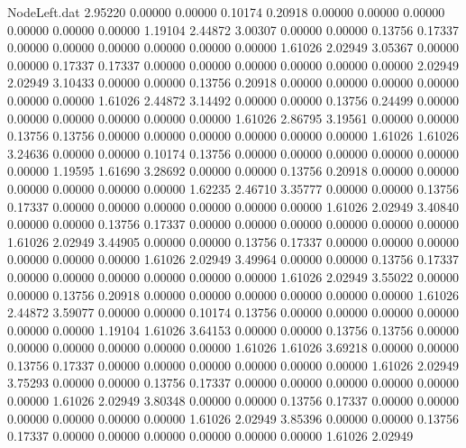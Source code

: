 \begin{filecontents}{NodeLeft.dat}
   2.95220    0.00000    0.00000     0.10174    0.20918    0.00000    0.00000    0.00000    0.00000    0.00000    0.00000    1.19104    2.44872
   3.00307    0.00000    0.00000     0.13756    0.17337    0.00000    0.00000    0.00000    0.00000    0.00000    0.00000    1.61026    2.02949
   3.05367    0.00000    0.00000     0.17337    0.17337    0.00000    0.00000    0.00000    0.00000    0.00000    0.00000    2.02949    2.02949
   3.10433    0.00000    0.00000     0.13756    0.20918    0.00000    0.00000    0.00000    0.00000    0.00000    0.00000    1.61026    2.44872
   3.14492    0.00000    0.00000     0.13756    0.24499    0.00000    0.00000    0.00000    0.00000    0.00000    0.00000    1.61026    2.86795
   3.19561    0.00000    0.00000     0.13756    0.13756    0.00000    0.00000    0.00000    0.00000    0.00000    0.00000    1.61026    1.61026
   3.24636    0.00000    0.00000     0.10174    0.13756    0.00000    0.00000    0.00000    0.00000    0.00000    0.00000    1.19595    1.61690
   3.28692    0.00000    0.00000     0.13756    0.20918    0.00000    0.00000    0.00000    0.00000    0.00000    0.00000    1.62235    2.46710
   3.35777    0.00000    0.00000     0.13756    0.17337    0.00000    0.00000    0.00000    0.00000    0.00000    0.00000    1.61026    2.02949
   3.40840    0.00000    0.00000     0.13756    0.17337    0.00000    0.00000    0.00000    0.00000    0.00000    0.00000    1.61026    2.02949
   3.44905    0.00000    0.00000     0.13756    0.17337    0.00000    0.00000    0.00000    0.00000    0.00000    0.00000    1.61026    2.02949
   3.49964    0.00000    0.00000     0.13756    0.17337    0.00000    0.00000    0.00000    0.00000    0.00000    0.00000    1.61026    2.02949
   3.55022    0.00000    0.00000     0.13756    0.20918    0.00000    0.00000    0.00000    0.00000    0.00000    0.00000    1.61026    2.44872
   3.59077    0.00000    0.00000     0.10174    0.13756    0.00000    0.00000    0.00000    0.00000    0.00000    0.00000    1.19104    1.61026
   3.64153    0.00000    0.00000     0.13756    0.13756    0.00000    0.00000    0.00000    0.00000    0.00000    0.00000    1.61026    1.61026
   3.69218    0.00000    0.00000     0.13756    0.17337    0.00000    0.00000    0.00000    0.00000    0.00000    0.00000    1.61026    2.02949
   3.75293    0.00000    0.00000     0.13756    0.17337    0.00000    0.00000    0.00000    0.00000    0.00000    0.00000    1.61026    2.02949
   3.80348    0.00000    0.00000     0.13756    0.17337    0.00000    0.00000    0.00000    0.00000    0.00000    0.00000    1.61026    2.02949
   3.85396    0.00000    0.00000     0.13756    0.17337    0.00000    0.00000    0.00000    0.00000    0.00000    0.00000    1.61026    2.02949

\end{filecontents}
